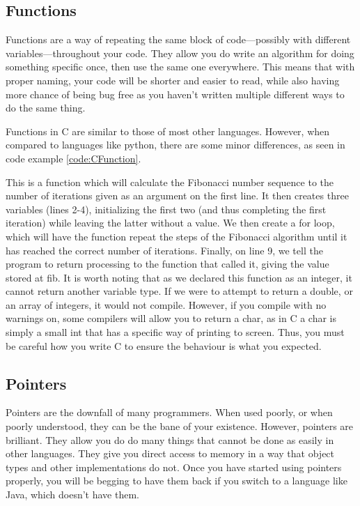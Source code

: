 			\begin{code}
				C}]{./CSwitch.c}
				\caption{Example of the C Switch Statement}
				\label{code:CSwitch}
			\end{code}
		\subsection{Functions}
			Functions are a way of repeating the same block of code---possibly with different variables---throughout your code. 
			They allow you do write an algorithm for doing something specific once, then use the same one everywhere. 
			This means that with proper naming, your code will be shorter and easier to read, while also having more chance of being bug free as you haven't written multiple different ways to do the same thing. 

			Functions in C are similar to those of most other languages. 
			However, when compared to languages like python, there are some minor differences, as seen in code example \ref{code:CFunction}.
			\begin{code}
				C}]{./CFunction.c}
				\caption{Example of a C Function}
				\label{code:CFunction}
			\end{code}
			This is a function which will calculate the Fibonacci number sequence to the number of iterations given as an argument on the first line. 
			It then creates three variables (lines 2-4), initializing the first two (and thus completing the first iteration) while leaving the latter without a value. 
			We then create a for loop, which will have the function repeat the steps of the Fibonacci algorithm until it has reached the correct number of iterations. 
			Finally, on line 9, we tell the program to return processing to the function that called it, giving the value stored at fib. 
			It is worth noting that as we declared this function as an integer, it cannot return another variable type. 
			If we were to attempt to return a double, or an array of integers, it would not compile. 
			However, if you compile with no warnings on, some compilers will allow you to return a char, as in C a char is simply a small int that has a specific way of printing to screen. 
			Thus, you must be careful how you write C to ensure the behaviour is what you expected. 

		\subsection{Pointers}
			Pointers are the downfall of many programmers. 
			When used poorly, or when poorly understood, they can be the bane of your existence. 
			However, pointers are brilliant. 
			They allow you do do many things that cannot be done as easily in other languages. 
			They give you direct access to memory in a way that object types and other implementations do not. 
			Once you have started using pointers properly, you will be begging to have them back if you switch to a language like Java, which doesn't have them. 

